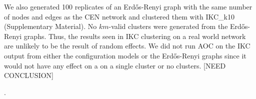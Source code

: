 \documentclass[12pt, oneside]{article}   	%
\begin{document}
We also generated 100 replicates of an Erd\H{o}s-Renyi graph with the same number of nodes and edges as the CEN network and clustered them with IKC\_k10 (Supplementary Material). No $km$-valid clusters were generated from the Erd\H{o}s-Renyi graphs. Thus, the results seen in IKC clustering on a real world network are unlikely to be the result of random effects. We did not run AOC on the IKC output from either the configuration models or the Erd\H{o}s-Renyi graphs since it would not have any effect on a on a single cluster or no clusters. [NEED CONCLUSION]

. 

\end{document}
